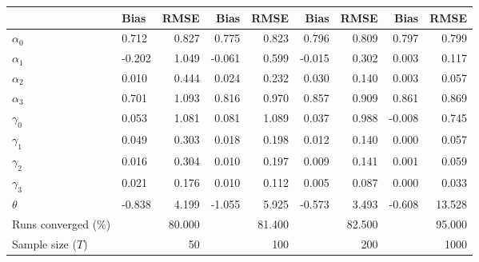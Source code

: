 
\begin{tabular}[t]{llrrrrrrr}
\toprule
  & Bias & RMSE & Bias & RMSE & Bias & RMSE & Bias & RMSE\\
\midrule
$\alpha_{0}$ & 0.712 & 0.827 & 0.775 & 0.823 & 0.796 & 0.809 & 0.797 & 0.799\\
$\alpha_{1}$ & -0.202 & 1.049 & -0.061 & 0.599 & -0.015 & 0.302 & 0.003 & 0.117\\
$\alpha_{2}$ & 0.010 & 0.444 & 0.024 & 0.232 & 0.030 & 0.140 & 0.003 & 0.057\\
$\alpha_{3}$ & 0.701 & 1.093 & 0.816 & 0.970 & 0.857 & 0.909 & 0.861 & 0.869\\
$\gamma_{0}$ & 0.053 & 1.081 & 0.081 & 1.089 & 0.037 & 0.988 & -0.008 & 0.745\\
$\gamma_{1}$ & 0.049 & 0.303 & 0.018 & 0.198 & 0.012 & 0.140 & 0.000 & 0.057\\
$\gamma_{2}$ & 0.016 & 0.304 & 0.010 & 0.197 & 0.009 & 0.141 & 0.001 & 0.059\\
$\gamma_{3}$ & 0.021 & 0.176 & 0.010 & 0.112 & 0.005 & 0.087 & 0.000 & 0.033\\
$\theta$ & -0.838 & 4.199 & -1.055 & 5.925 & -0.573 & 3.493 & -0.608 & 13.528\\
Runs converged (\%) &  & 80.000 &  & 81.400 &  & 82.500 &  & 95.000\\
Sample size ($T$) &  & 50 &  & 100 &  & 200 &  & 1000\\
\bottomrule
\end{tabular}
